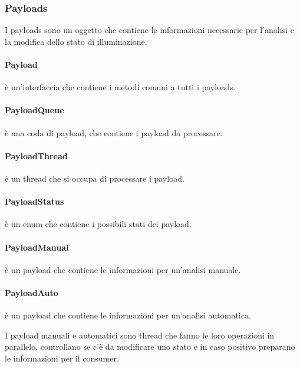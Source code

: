 \subsubsection{Payloads}

I payloads sono un oggetto che contiene le informazioni necessarie per l'analisi e la modifica dello stato di illuminazione.

\paragraph{Payload} è un'interfaccia che contiene i metodi comuni a tutti i payloads.

\paragraph{PayloadQueue} è una coda di payload, che contiene i payload da processare.

\paragraph{PayloadThread} è un thread che si occupa di processare i payload.

\paragraph{PayloadStatus} è un enum che contiene i possibili stati dei payload.

\paragraph{PayloadManual} è un payload che contiene le informazioni per un'analisi manuale.

\paragraph{PayloadAuto} è un payload che contiene le informazioni per un'analisi automatica.

I payload manuali e automatici sono thread che fanno le loro operazioni in parallelo, controllano se c'è da modificare uno stato e in caso positivo preparano le informazioni per il consumer.
